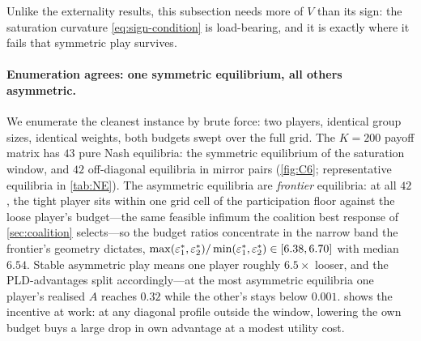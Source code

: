 Unlike the externality results, this subsection needs more of $V$
than its sign: the saturation curvature \eqref{eq:sign-condition}
is load-bearing, and it is exactly where it fails that symmetric
play survives.

\paragraph{Enumeration agrees: one symmetric equilibrium, all
others asymmetric.} We enumerate the cleanest instance by brute
force: two players, identical group sizes, identical weights, both
budgets swept over the full grid. The $K = 200$ payoff matrix has
$43$ pure Nash equilibria: the symmetric equilibrium of the
saturation window, and $42$ off-diagonal equilibria in mirror
pairs (\cref{fig:C6}; representative equilibria in \cref{tab:NE}).
The asymmetric equilibria are \emph{frontier} equilibria: at all
$42$, the tight player sits within one grid cell of the
participation floor against the loose player's budget---the same
feasible infimum the coalition best response of
\cref{sec:coalition} selects---so the budget ratios concentrate in
the narrow band the frontier's geometry dictates,
$\max(\varepsilon_1^*,\varepsilon_2^*)/\min(\varepsilon_1^*,\varepsilon_2^*) \in [6.38, 6.70]$
with median $6.54$. Stable asymmetric play means one player
roughly $6.5\times$ looser, and the \ac{PLD}-advantages split
accordingly---at the most asymmetric equilibria one player's
realised $A$ reaches $0.32$ while the other's stays below $0.001$.
 shows the incentive at work: at any diagonal
profile outside the window, lowering the own budget buys a large
drop in own advantage at a modest utility cost.

